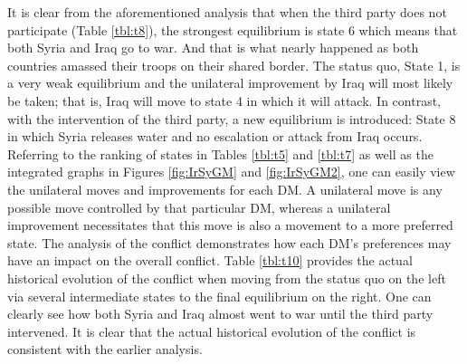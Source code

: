 \documentclass[letterpaper,12pt,titlepage,oneside,final]{book}
\begin{document}
It is clear from the aforementioned analysis that when the third party does not participate (Table  \ref{tbl:t8}), the strongest equilibrium is state 6 which means that both Syria and Iraq go to war. And that is what nearly happened as both countries amassed their troops on their shared border. The status quo, State 1, is a very weak equilibrium and the unilateral improvement by Iraq will most likely be taken; that is, Iraq will move to state 4 in which it will attack. In contrast, with the intervention of the third party, a new equilibrium is introduced: State 8 in which Syria releases water and no escalation or attack from Iraq occurs. Referring to the ranking of states in Tables  \ref{tbl:t5} and  \ref{tbl:t7} as well as the integrated graphs in Figures \ref{fig:IrSyGM} and \ref{fig:IrSyGM2}, one can easily view the unilateral moves and improvements for each DM. A unilateral move is any possible move controlled by that particular DM, whereas a unilateral improvement necessitates that this move is also a movement to a more preferred state.  
The analysis of the conflict demonstrates how each DM's preferences may have an impact on the overall conflict. Table \ref{tbl:t10} provides the actual historical evolution of the conflict when moving from the status quo on the left via several intermediate states to the final equilibrium on the right. One can clearly see how both Syria and Iraq almost went to war until the third party intervened. It is clear that the actual historical evolution of the conflict is consistent with the earlier analysis.
\end{document}
